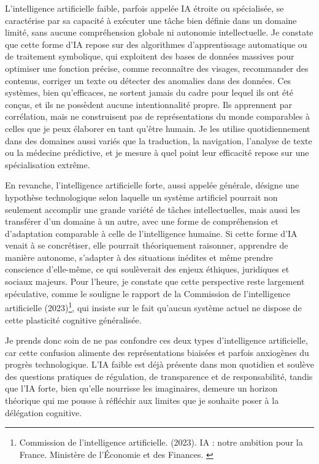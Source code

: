 \documentclass[11pt,a4paper]{report}
\begin{document}
L’intelligence artificielle faible, parfois appelée IA étroite ou spécialisée, se caractérise par sa capacité à exécuter une tâche bien définie dans un domaine limité, sans aucune compréhension globale ni autonomie intellectuelle. Je constate que cette forme d’IA repose sur des algorithmes d’apprentissage automatique ou de traitement symbolique, qui exploitent des bases de données massives pour optimiser une fonction précise, comme reconnaître des visages, recommander des contenus, corriger un texte ou détecter des anomalies dans des données. Ces systèmes, bien qu’efficaces, ne sortent jamais du cadre pour lequel ils ont été conçus, et ils ne possèdent aucune intentionnalité propre. Ils apprennent par corrélation, mais ne construisent pas de représentations du monde comparables à celles que je peux élaborer en tant qu’être humain. Je les utilise quotidiennement dans des domaines aussi variés que la traduction, la navigation, l’analyse de texte ou la médecine prédictive, et je mesure à quel point leur efficacité repose sur une spécialisation extrême.

En revanche, l’intelligence artificielle forte, aussi appelée générale, désigne une hypothèse technologique selon laquelle un système artificiel pourrait non seulement accomplir une grande variété de tâches intellectuelles, mais aussi les transférer d’un domaine à un autre, avec une forme de compréhension et d’adaptation comparable à celle de l’intelligence humaine. Si cette forme d’IA venait à se concrétiser, elle pourrait théoriquement raisonner, apprendre de manière autonome, s’adapter à des situations inédites et même prendre conscience d’elle-même, ce qui soulèverait des enjeux éthiques, juridiques et sociaux majeurs. Pour l’heure, je constate que cette perspective reste largement spéculative, comme le souligne le rapport de la Commission de l’intelligence artificielle (2023)\footnote{Commission de l’intelligence artificielle. (2023). IA : notre ambition pour la France. Ministère de l’Économie et des Finances. \cite{iagouv}}, qui insiste sur le fait qu’aucun système actuel ne dispose de cette plasticité cognitive généralisée.

Je prends donc soin de ne pas confondre ces deux types d’intelligence artificielle, car cette confusion alimente des représentations biaisées et parfois anxiogènes du progrès technologique. L’IA faible est déjà présente dans mon quotidien et soulève des questions pratiques de régulation, de transparence et de responsabilité, tandis que l’IA forte, bien qu’elle nourrisse les imaginaires, demeure un horizon théorique qui me pousse à réfléchir aux limites que je souhaite poser à la délégation cognitive.
\end{document}
